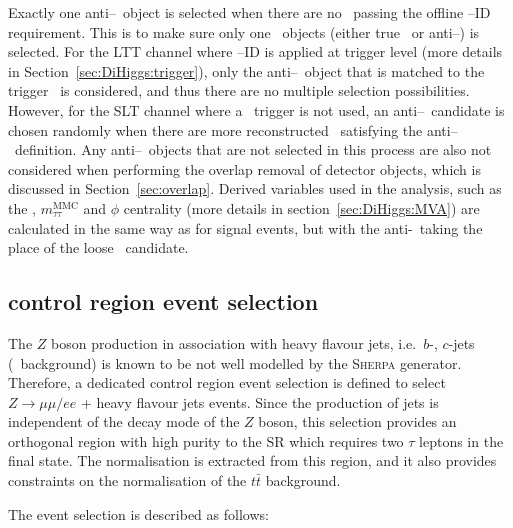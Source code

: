 Exactly one anti--\tauhad\ object is selected when there are no \tauhad\
passing the offline \tauhad--ID requirement. 
This is to make sure only one \tauhad\ objects (either true \tauhad\ or
anti--\tauhad) is selected.
For the LTT channel where \tauhad--ID is applied at trigger level 
(more details in Section~\ref{sec:DiHiggs:trigger}),
only the anti--\tauhad\ object that is matched to the
trigger \tauhad\ is considered, and thus there are 
no multiple selection possibilities. 
However, for the SLT channel where a \tauhad\ trigger is not used, 
an anti--\tauhad\ candidate is chosen randomly 
when there are more reconstructed
\tauhad\ satisfying the anti--\tauhad\ definition. 
Any anti--\tauhad\ objects that are not selected in this process are also not
considered when performing the overlap removal of detector objects, 
which is discussed in Section~\ref{sec:overlap}.
Derived variables used in the analysis, such as the 
\MET, $m^{\mathrm{MMC}}_{\tau\tau}$ and \MET$\phi$ centrality
(more details in section~\ref{sec:DiHiggs:MVA})
are calculated in the same way as for signal events, 
but with the anti-\tauhad\ taking the place of the loose \tauhad\ candidate.


\subsection{\texorpdfstring{\ZHF}\ control region event selection}
\label{sec:selection:zcr}


The $Z$ boson production in association 
with heavy flavour jets, i.e.\ $b$-, $c$-jets (\ZHF\ background) 
is known to be 
not well modelled by the \textsc{Sherpa} generator. 
Therefore, a dedicated control region event selection is defined
to select $Z \rightarrow \mu \mu / e e$ + heavy flavour jets events. 
Since the production of jets is independent of the decay mode 
of the $Z$ boson, this selection provides an orthogonal region with 
high purity to the SR which requires two $\tau$ leptons in the final state.  
The normalisation is extracted from this region,
and it also provides constraints 
on the normalisation of the $t\bar t$ background. 

The event selection is described as follows:

